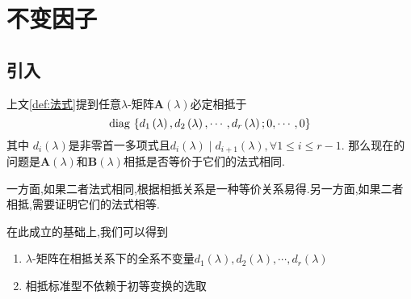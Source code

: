 \newpage
\section{不变因子}
\subsection{引入}
上文\cref{def:法式}提到任意$\lambda$-矩阵$\bm{A}\left(\lambda\right)$必定相抵于
\[
    \operatorname{diag\,} \left\{
    d_1\left(\lambda\right),d_2\left(\lambda\right),\cdots,d_r\left(\lambda\right);0,\cdots,0
    \right\}
\]其中
$d_i\left(\lambda\right)$是非零首一多项式且$d_i\left(\lambda\right)\mid d_{i+1}\left(\lambda\right),\forall 1\leqslant i\leqslant r-1.$
那么现在的问题是$\bm{A}\left(\lambda\right)$和$\bm{B}\left(\lambda\right)$相抵是否等价于它们的法式相同.

一方面,如果二者法式相同,根据相抵关系是一种等价关系易得.另一方面,如果二者相抵,需要证明它们的法式相等.

在此成立的基础上,我们可以得到\begin{enumerate}[label=\arabic*)]
    \item $\lambda$-矩阵在相抵关系下的全系不变量$d_1\left(\lambda\right),d_2\left(\lambda\right),\cdots,d_r\left(\lambda\right)$
    \item 相抵标准型不依赖于初等变换的选取
\end{enumerate}

